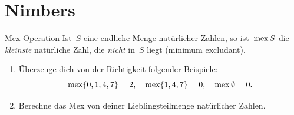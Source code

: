 \documentclass{zirkelblatt}
\newcommand{\head}[1]{\section*{\rmfamily #1}}%
\begin{document}
%


\head{Nimbers}

\begin{aufgabe}{Mex-Operation}
\label{mex}
Ist~$S$ eine endliche Menge natürlicher Zahlen, so ist~$\operatorname{mex} S$ die \emph{kleinste}
natürliche Zahl, die \emph{nicht} in~$S$ liegt (minimum excludant).
\begin{enumerate}
\item Überzeuge dich von der Richtigkeit folgender Beispiele:
\[
  \operatorname{mex} \{ 0,1,4,7 \} = 2, \quad
  \operatorname{mex} \{ 1,4,7 \} = 0, \quad
  \operatorname{mex} \emptyset = 0. \]
\item Berechne das Mex von deiner Lieblingsteilmenge natürlicher Zahlen.
\end{enumerate}
\end{aufgabe}
\end{document}
